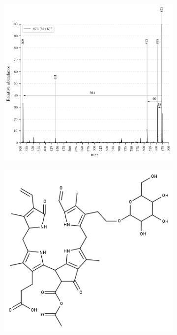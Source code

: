 \begin{figure}[htbp]
  \begin{subfigure}[b]{0.5\textwidth}
    \includegraphics[width=\textwidth, height=\textwidth]{figures/Kapitel4/Kataboliten/VWA_MS_LeafSpray_873.png}
    \caption{}
    \label{fig:873MKLeafspray}
  \end{subfigure}
  \hfill
  \begin{subfigure}[b]{0.5\textwidth}
    \includegraphics[width=\textwidth, height=\textwidth]{figures/Kapitel4/Kataboliten/fragmentation_structures/VWA_Katabolit_873.png}
    \caption{}
    \label{fig:873MKstructure}
  \end{subfigure}
  

\end{figure}
